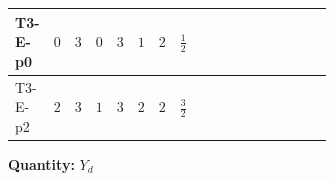 \documentclass[8pt]{article}
\begin{document}
\begin{landscape}
\begin{longtable}{@{}llcccccc >{\raggedright\arraybackslash}p{0.21\linewidth} >{\raggedright\arraybackslash}p{0.21\linewidth} >{\raggedright\arraybackslash}p{0.21\linewidth}@{}}
T3-E-p0 & $0$ & $3$ & $0$ & $3$ & $1$ & $2$ & $\frac{1}{2}$ & \scriptsize\adjustbox{max width=\linewidth}{$\begin{gathered} +\frac{3}{2} (\left({Y_d}\,\left({Y_d}\right)^{\dagger}\,{Y_d}\right)_{ij}-\left({Y_u}\,\left({Y_u}\right)^{\dagger}\,{Y_d}\right)_{ij})\end{gathered}$} & \scriptsize\adjustbox{max width=\linewidth}{$\begin{gathered} -\frac{9}{4} {g_2}^2 \left({Y_d}\right)_{ij}\end{gathered}$} & \scriptsize\adjustbox{max width=\linewidth}{$\begin{gathered} -8 {g_3}^2 \left({Y_d}\right)_{ij}\end{gathered}$} \\
\midrule
T3-E-p2 & $2$ & $3$ & $1$ & $3$ & $2$ & $2$ & $\frac{3}{2}$ & \scriptsize\adjustbox{max width=\linewidth}{$\begin{gathered} +\frac{3}{2} (\left({Y_d}\,\left({Y_d}\right)^{\dagger}\,{Y_d}\right)_{ij}-\left({Y_u}\,\left({Y_u}\right)^{\dagger}\,{Y_d}\right)_{ij})\end{gathered}$} & \scriptsize\adjustbox{max width=\linewidth}{$\begin{gathered} -\frac{9}{4} {g_2}^2 \left({Y_d}\right)_{ij}\end{gathered}$} & \scriptsize\adjustbox{max width=\linewidth}{$\begin{gathered} -8 {g_3}^2 \left({Y_d}\right)_{ij}\end{gathered}$} \\
\midrule
\bottomrule
\end{longtable}
\clearpage
\noindent\textbf{Quantity: }$Y_d$\par\smallskip

\end{landscape}
\end{document}
